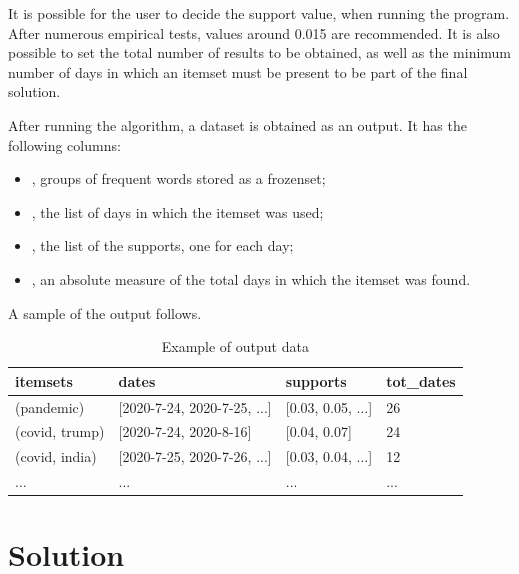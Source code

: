It is possible for the user to decide the support value, when running the program. After numerous empirical tests, values around 0.015 are recommended. It is also possible to set the total number of results to be obtained, as well as the minimum number of days in which an itemset must be present to be part of the final solution.

After running the algorithm, a dataset is obtained as an output. It has the following columns:

\begin{itemize}
  \item {}, groups of frequent words stored as a frozenset;
  \item {}, the list of days in which the itemset was used;
  \item {}, the list of the supports, one for each day;
  \item {}, an absolute measure of the total days in which the itemset was found.
\end{itemize}

A sample of the output follows.

\begin{table}[h]
  \centering
  \small
  \tabcolsep=0.14cm
  \begin{tabular}{@{}llll@{}}
  \toprule
  \textbf{itemsets}         & \textbf{dates}                     & \textbf{supports}      & \textbf{tot\_dates}  \\ \midrule
  (pandemic)                & {[}2020-7-24, 2020-7-25, ...{]}    & {[}0.03, 0.05, ...{]}  & 26                   \\
  (covid, trump)            & {[}2020-7-24, 2020-8-16{]}         & {[}0.04, 0.07{]}       & 24                   \\
  (covid, india)          & {[}2020-7-25, 2020-7-26, ...{]}    & {[}0.03, 0.04, ...{]}  & 12                   \\
  ...                       & ...                                & ...                    & ...                  \\ \bottomrule
  \end{tabular}
  \caption{Example of output data}
\end{table}


\section{Solution}\label{sect_solution}

